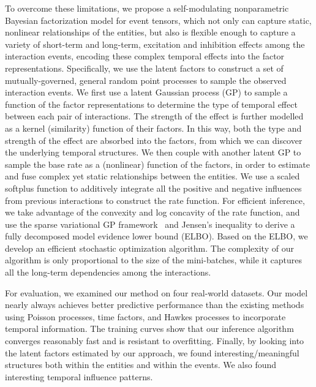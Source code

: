 To overcome these limitations, we propose a self-modulating nonparametric Bayesian factorization model for event tensors, which not only can capture static, nonlinear  relationships of the entities, but also is flexible enough to capture a variety of short-term and long-term, excitation and inhibition effects among the interaction events, encoding these complex temporal effects into the factor representations.  Specifically, we use the latent factors to construct a set of mutually-governed, general random point processes to sample the observed interaction events. We first use a latent Gaussian process (GP) to sample a function of the factor representations to determine the type of temporal effect between each pair of interactions. The strength of the effect is further modelled as a kernel (similarity) function of their factors. In this way, both the type  and strength of the effect are absorbed into the factors, from which we can discover the underlying temporal structures. We then couple with another latent GP to sample the base rate as a (nonlinear) function of the factors, in order to estimate and fuse complex yet  static relationships between the entities. We use a scaled softplus function to additively integrate all the positive and negative influences from previous interactions to construct the rate function. For efficient inference, we take advantage of the convexity and log concavity of the rate function, and use the sparse variational GP framework~\cite{hensman2013gaussian} and Jensen's inequality to derive a fully decomposed model evidence lower bound (ELBO). Based on the ELBO, we develop an efficient stochastic optimization algorithm. The complexity of our algorithm is only proportional to the size of the mini-batches, while it captures all the long-term dependencies among the interactions. 


For evaluation, we examined our method on four real-world datasets. Our model nearly always achieves better predictive performance than the existing methods using Poisson processes, time factors, and Hawkes processes to incorporate temporal information. The training curves show that our inference algorithm converges reasonably fast and is resistant to overfitting. Finally, by looking into the latent factors estimated by our approach, we found interesting/meaningful structures both within the entities and within the events. We also found interesting temporal influence patterns.   

